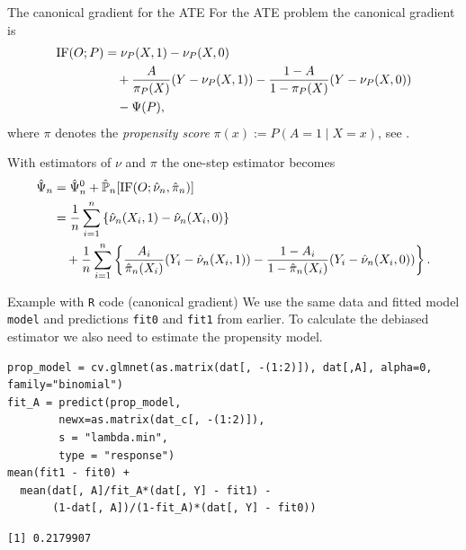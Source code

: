 \documentclass[handout]{beamer}\usepackage{listings}
\begin{document}
\begin{frame}[label={sec:orgf7dccee}]{The canonical gradient for the ATE}
\small For the ATE problem the canonical gradient is
\begin{align*}
  \mathrm{IF}(O; P)
  & = \nu_P(X, 1) - \nu_P(X, 0)
  \\
  & \quad
    + \frac{A}{\pi_P(X)}(Y - \nu_P(X, 1))
    - \frac{1-A}{1-\pi_P(X)}(Y - \nu_P(X, 0))
  \\
  & \quad
    - \Psi(P),
\end{align*}
where \(\pi\) denotes the \textit{propensity score} \(\pi(x) := P(A=1 \mid X=x)\), see
\cite{kennedy2022semiparametric,kennedy2016semiparametric}.

\vfill

With estimators of \(\nu\) and \(\pi\) the one-step estimator becomes
\begin{align*}
  \hat{\Psi}_n
  &  = \hat{\Psi}^0_n + \hat{\mathbb{P}}_n[\mathrm{IF}(O; \hat{\nu}_n, \hat{\pi}_n)]
  \\
  & = \frac{1}{n}\sum_{i=1}^{n}
    \left\{
    \hat\nu_n(X_i, 1) - \hat\nu_n(X_i, 0)
    \right\}
  \\
  & \quad
    +\frac{1}{n}\sum_{i=1}^{n}
    \left\{
    \frac{A_i}{\hat\pi_n(X_i)}(Y_i - \hat\nu_n(X_i, 1))
    - \frac{1-A_i}{1-\hat\pi_n(X_i)}(Y_i - \hat\nu_n(X_i, 0))    
    \right\}.
\end{align*}
\end{frame}

\begin{frame}[label={sec:orgd322fb1},fragile]{Example with \texttt{R} code (canonical gradient)}
 We use the same data and fitted model \texttt{model} and predictions \texttt{fit0} and \texttt{fit1} from earlier. To
calculate the debiased estimator we also need to estimate the propensity model.
\lstset{language=r,label= ,caption= ,captionpos=b,numbers=none}
\begin{lstlisting}
prop_model = cv.glmnet(as.matrix(dat[, -(1:2)]), dat[,A], alpha=0, family="binomial")
fit_A = predict(prop_model,
		newx=as.matrix(dat_c[, -(1:2)]),
		s = "lambda.min",
		type = "response")
mean(fit1 - fit0) + 
  mean(dat[, A]/fit_A*(dat[, Y] - fit1) -
       (1-dat[, A])/(1-fit_A)*(dat[, Y] - fit0))
\end{lstlisting}

\begin{verbatim}
[1] 0.2179907
\end{verbatim}
\end{frame}
\end{document}
